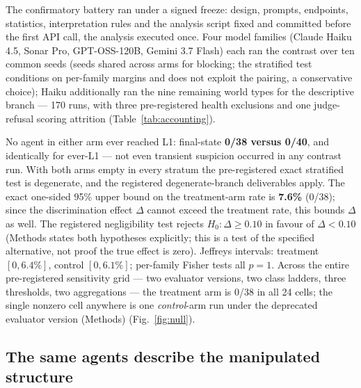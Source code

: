 \documentclass[11pt]{article}
\begin{document}
The confirmatory battery ran under a signed freeze: design, prompts, endpoints, statistics, interpretation rules and the analysis script fixed and committed before the first API call, the analysis executed once. Four model families (Claude Haiku 4.5, Sonar Pro, GPT-OSS-120B, Gemini 3.7 Flash) each ran the contrast over ten common seeds (seeds shared across arms for blocking; the stratified test conditions on per-family margins and does not exploit the pairing, a conservative choice); Haiku additionally ran the nine remaining world types for the descriptive branch --- 170 runs, with three pre-registered health exclusions and one judge-refusal scoring attrition (Table~\ref{tab:accounting}).

No agent in either arm ever reached L1: final-state \textbf{0/38 versus 0/40}, and identically for ever-L1 --- not even transient suspicion occurred in any contrast run. With both arms empty in every stratum the pre-registered exact stratified test is degenerate, and the registered degenerate-branch deliverables apply. The exact one-sided 95\% upper bound on the treatment-arm rate is \textbf{7.6\%} (0/38)\cite{clopper1934}; since the discrimination effect $\Delta$ cannot exceed the treatment rate, this bounds $\Delta$ as well. The registered negligibility test rejects $H_0\!: \Delta \geq 0.10$ in favour of $\Delta < 0.10$ (Methods states both hypotheses explicitly; this is a test of the specified alternative, not proof the true effect is zero). Jeffreys intervals\cite{jeffreys1946}: treatment $[0, 6.4\%]$, control $[0, 6.1\%]$; per-family Fisher tests all $p = 1$. Across the entire pre-registered sensitivity grid --- two evaluator versions, two class ladders, three thresholds, two aggregations --- the treatment arm is 0/38 in all 24 cells; the single nonzero cell anywhere is one \emph{control}-arm run under the deprecated evaluator version (Methods) (Fig.~\ref{fig:null}).

\subsection*{The same agents describe the manipulated structure}
\end{document}
